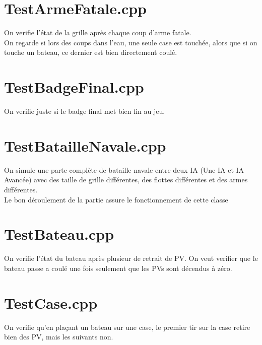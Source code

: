     \section{TestArmeFatale.cpp}
        On verifie l'état de la grille après chaque coup d'arme fatale.\\
        On regarde si lors des coups dans l'eau, une seule case est touchée, alors que si on touche un bateau, ce dernier est bien directement coulé.
    \section{TestBadgeFinal.cpp}
        On verifie juste si le badge final met bien fin au jeu.
    \section{TestBatailleNavale.cpp}
        On simule une parte complète de bataille navale entre deux IA (Une IA et IA Avancée) avec des taille de grille différentes, des flottes différentes et des armes différentes.\\
        Le bon déroulement de la partie assure le fonctionnement de cette classe
    \section{TestBateau.cpp}
        On verifie l'état du bateau après plusieur de retrait de PV. On veut verifier que le bateau passe a coulé une fois seulement que les PVs sont décendus à zéro.
    \section{TestCase.cpp}
        On verifie qu'en plaçant un bateau sur une case, le premier tir sur la case retire bien des PV, mais les suivants non.

